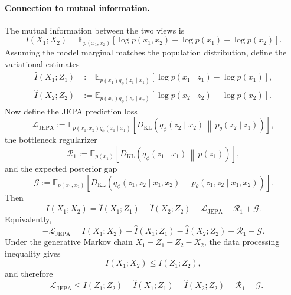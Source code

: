 \documentclass{article}
\newcommand{\E}{\mathbb{E}}
\newcommand{\KL}{D_{\mathrm{KL}}}
\begin{document}
\paragraph{Connection to mutual information.}
The mutual information between the two views is
\begin{equation}
I(X_1;X_2)
=
\E_{p(x_1,x_2)}
\left[
\log p(x_1,x_2)
-
\log p(x_1)
-
\log p(x_2)
\right].
\label{eq:data-mi}
\end{equation}
Assuming the model marginal matches the population distribution, define the variational estimates
\begin{align}
\widehat I(X_1;Z_1)
&:=
\E_{p(x_1)q_\phi(z_1\mid x_1)}
\left[
\log p(x_1\mid z_1)
-
\log p(x_1)
\right],
\label{eq:ihat-x1z1}
\\
\widehat I(X_2;Z_2)
&:=
\E_{p(x_2)q_\phi(z_2\mid x_2)}
\left[
\log p(x_2\mid z_2)
-
\log p(x_2)
\right].
\label{eq:ihat-x2z2}
\end{align}
Now define the JEPA prediction loss
\begin{equation}
\mathcal L_{\mathrm{JEPA}}
:=
\E_{p(x_1,x_2)q_\phi(z_1\mid x_1)}
\left[
\KL
\left(
q_\phi(z_2\mid x_2)
\,\middle\|\,
p_\theta(z_2\mid z_1)
\right)
\right],
\label{eq:jepa-loss}
\end{equation}
the bottleneck regularizer
\begin{equation}
\mathcal R_1
:=
\E_{p(x_1)}
\left[
\KL
\left(
q_\phi(z_1\mid x_1)
\,\middle\|\,
p(z_1)
\right)
\right],
\label{eq:jepa-bottleneck}
\end{equation}
and the expected posterior gap
\begin{equation}
\mathcal G
:=
\E_{p(x_1,x_2)}
\left[
\KL
\left(
q_\phi(z_1,z_2\mid x_1,x_2)
\,\middle\|\,
p_\theta(z_1,z_2\mid x_1,x_2)
\right)
\right].
\label{eq:jepa-gap}
\end{equation}
Then
\begin{equation}
I(X_1;X_2)
=
\widehat I(X_1;Z_1)
+
\widehat I(X_2;Z_2)
-
\mathcal L_{\mathrm{JEPA}}
-
\mathcal R_1
+
\mathcal G.
\label{eq:jepa-mi-decomposition}
\end{equation}
Equivalently,
\begin{equation}
-\mathcal L_{\mathrm{JEPA}}
=
I(X_1;X_2)
-
\widehat I(X_1;Z_1)
-
\widehat I(X_2;Z_2)
+
\mathcal R_1
-
\mathcal G.
\label{eq:jepa-negative-loss}
\end{equation}
Under the generative Markov chain $X_1 - Z_1 - Z_2 - X_2$, the data processing inequality gives
\begin{equation}
I(X_1;X_2)
\le
I(Z_1;Z_2),
\label{eq:jepa-dpi}
\end{equation}
and therefore
\begin{equation}
-\mathcal L_{\mathrm{JEPA}}
\le
I(Z_1;Z_2)
-
\widehat I(X_1;Z_1)
-
\widehat I(X_2;Z_2)
+
\mathcal R_1
-
\mathcal G.
\label{eq:jepa-ib-bound}
\end{equation}
\end{document}
